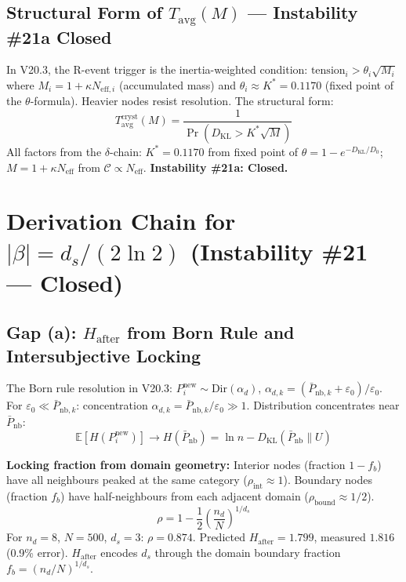 \documentclass[12pt, a4paper]{article}
\begin{document}
\subsection{Structural Form of $T_{\mathrm{avg}}(M)$ --- Instability \#21a Closed}

\begin{derivedbox}[title={$T_{\mathrm{avg}}^{\mathrm{cryst}}(M) = 1/\Pr(D_{\mathrm{KL}} > K^*\sqrt{M})$ --- Derived}]
In V20.3, the R-event trigger is the inertia-weighted condition:
$\mathrm{tension}_i > \theta_i\sqrt{M_i}$ where $M_i = 1 + \kappa N_{\mathrm{eff},i}$ (accumulated mass)
and $\theta_i \approx K^* = 0.1170$ (fixed point of the $\theta$-formula).
Heavier nodes resist resolution. The structural form:
\[
  T_{\mathrm{avg}}^{\mathrm{cryst}}(M) = \frac{1}{\Pr\!\left(D_{\mathrm{KL}} > K^*\sqrt{M}\right)}
\]
All factors from the $\delta$-chain: $K^* = 0.1170$ from fixed point of
$\theta = 1 - e^{-D_{\mathrm{KL}}/D_0}$; $M = 1 + \kappa N_{\mathrm{eff}}$ from
$\mathcal{C} \propto N_{\mathrm{eff}}$.
\textbf{Instability \#21a: Closed.}
\end{derivedbox}

\section{Derivation Chain for $|\beta| = d_s/(2\ln 2)$ (Instability \#21 --- Closed)}

\subsection{Gap (a): $H_{\mathrm{after}}$ from Born Rule and Intersubjective Locking}

\begin{derivedbox}[title={$H_{\mathrm{after}} = \ln n - D_{\mathrm{KL}}(\bar{P}_{\mathrm{nb}}\|U)$ --- Derived}]
The Born rule resolution in V20.3: $P_i^{\mathrm{new}} \sim \mathrm{Dir}(\alpha_d)$,
$\alpha_{d,k} = (\bar{P}_{\mathrm{nb},k} + \varepsilon_0)/\varepsilon_0$.
For $\varepsilon_0 \ll \bar{P}_{\mathrm{nb},k}$: concentration $\alpha_{d,k} = \bar{P}_{\mathrm{nb},k}/\varepsilon_0 \gg 1$.
Distribution concentrates near $\bar{P}_{\mathrm{nb}}$:
\[
  \mathbb{E}[H(P_i^{\mathrm{new}})] \to H(\bar{P}_{\mathrm{nb}}) = \ln n - D_{\mathrm{KL}}(\bar{P}_{\mathrm{nb}}\|U)
\]

\textbf{Locking fraction from domain geometry:}
Interior nodes (fraction $1 - f_b$) have all neighbours peaked at the same category ($\rho_{\mathrm{int}} \approx 1$).
Boundary nodes (fraction $f_b$) have half-neighbours from each adjacent domain ($\rho_{\mathrm{bound}} \approx 1/2$).
\[
  \rho = 1 - \frac{1}{2}\!\left(\frac{n_d}{N}\right)^{1/d_s}
\]
For $n_d = 8$, $N = 500$, $d_s = 3$: $\rho = 0.874$.
Predicted $H_{\mathrm{after}} = 1.799$, measured $1.816$ (0.9\% error).
$H_{\mathrm{after}}$ encodes $d_s$ through the domain boundary fraction $f_b = (n_d/N)^{1/d_s}$.
\end{derivedbox}
\end{document}

